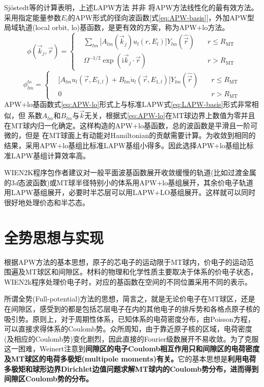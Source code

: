 Sj\"ostedt等\cite{SSC114-15_2000}的计算表明，上述LAPW方法%
并非%
将APW方法线性化的最有效方法。采用指定能量参数$E_l$的APW形式的径向波函数[式\eqref{eq:APW-basis}]，外加APW型局域轨道(local orbit, lo)基函数，是更有效的方案，称为APW+lo方法。
\begin{equation}
  \phi(\vec k_j,\vec r)=\left\{
  \begin{aligned}
    &\sum_{lm}\big[A_{lm}(\vec k_j)u_l(r,E_l)\big]Y_{lm}(\hat{\vec r})\quad&r\leqslant R_{\mathrm{MT}}\\
    &\Omega^{-1/2}\exp(\mathrm{i}\vec k_j\cdot\vec r) &r>R_{\mathrm{MT}}
  \end{aligned}\right.
  \label{eq:APW-basis}
\end{equation}
\begin{equation}
  \phi_{lm}^{lo}=\left\{
  \begin{aligned}
  &\big[A_{lm}u_l(\vec r,E_{1,l})+B_{lm}\dot u_l(\vec r,E_{1,l})\big]Y_{lm}(\hat{\vec r})\quad&r\leqslant R_{\mathrm{MT}}\\
  &0&r>R_{\mathrm{MT}}
  \end{aligned}\right.
    \label{eq:APW-lo}
\end{equation}
APW+lo基函数式\eqref{eq:APW-lo}形式上与标准LAPW式\eqref{eq:LAPW-basis}形式非常相似，但%
系数$A_{lm}$和$B_{lm}$与$\vec k$无关，根据式\eqref{eq:APW-lo}在MT球边界上数值为零并且在MT球内归一化确定。这样构造的APW+lo基函数，总的波函数是平滑且一阶可微的，但是%
在MT球面上有动能对Hamiltonian的贡献需要计算。为收敛到相同的结果，采用APW+lo基组比标准LAPW基组小得多\cite{PRB64-195134_2001}。因此选择APW+lo基组比标准LAPW基组计算效率高。

WIEN2K程序包作者建议\cite{CPC59-399_1990,WIEN2K-UG_2001,CPC147-71_2002}对一般平面波基函数展开收敛缓慢的轨道(比如过渡金属的3\textit{d}态波函数)或MT球半径特别小的体系用APW+lo基组展开，其余价电子轨道用LAPW基组展开，必要时半芯层可以用LAPW+LO基组展开。这样就可以同时很好地处理价态和半芯态。

\section{全势思想与实现}
根据\textrm{APW}方法的基本思想，原子的芯电子的运动限于\textrm{MT}球内，价电子的运动范围遍及\textrm{MT}球区和间隙区。材料的物理和化学性质主要取决于体系的价电子状态，\textrm{WIEN2k}程序处理价电子时，对应的基函数在空间的不同位置采用不同的表示。

所谓全势(\textrm{Full-potential})方法的思想，简言之，就是无论价电子在\textrm{MT}球区，还是在间隙区，感受到的都是包括芯层电子在内的其他电子的排斥势和各格点原子核的吸引势。原则上，对于周期性体系，已知体系的电荷密度分布，由\textrm{Poisson}方程，可以直接求得体系的\textrm{Coulomb}势。众所周知，由于靠近原子核的区域，电荷密度(及相应的\textrm{Coulomb}势)变化剧烈，因此直接的\textrm{Fourier}级数展开不易收敛。为了克服这一困难，\textrm{Weinert}\cite{JMP22-2433_1981}注意到\textbf{间隙区的电子\textrm{Coulomb}相互作用只和间隙区的电荷密度及\textrm{MT}球区的电荷多极矩(\textrm{multipole moments})有关。}它的基本思想是\textbf{利用电荷多极矩和球形边界\textrm{Dirichlet}边值问题求解\textrm{MT}球内的\textrm{Coulomb}势分布，进而得到间隙区\textrm{Coulomb}势的分布。}

